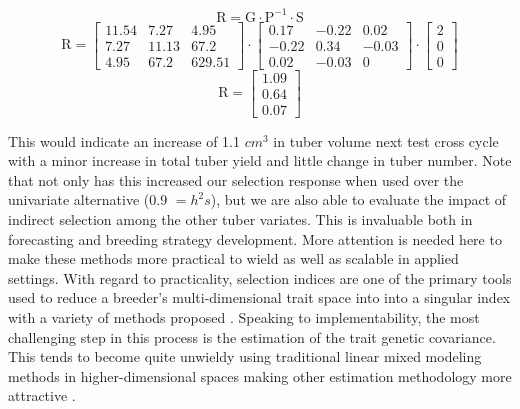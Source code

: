 \documentclass[
]{article}
\begin{document}
\[ \mathrm {R = G \cdot P^{-1} \cdot S}\]
\[ \mathrm {R} = \begin{bmatrix}11.54 & 7.27 & 4.95 \\ 7.27 & 11.13 & 67.2 \\ 4.95 & 67.2 & 629.51\end{bmatrix}\cdot\begin{bmatrix}0.17 & -0.22 & 0.02 \\ -0.22 & 0.34 & -0.03 \\ 0.02 & -0.03 & 0\end{bmatrix} \cdot \begin{bmatrix} 2 \\ 0 \\ 0 \end{bmatrix} \]
\[\mathrm {R} = \begin{bmatrix}1.09 \\ 0.64 \\ 0.07\end{bmatrix}\]

This would indicate an increase of 1.1 \(cm^3\) in tuber volume next
test cross cycle with a minor increase in total tuber yield and little
change in tuber number. Note that not only has this increased our
selection response when used over the univariate alternative (0.9
\(= h^2 s\)), but we are also able to evaluate the impact of indirect
selection among the other tuber variates. This is invaluable both in
forecasting and breeding strategy development. More attention is needed
here to make these methods more practical to wield as well as scalable
in applied settings. With regard to practicality, selection indices are
one of the primary tools used to reduce a breeder's multi-dimensional
trait space into into a singular index with a variety of methods
proposed \autocite{Kempthorne1959,Bulmer1981}. Speaking to
implementability, the most challenging step in this process is the
estimation of the trait genetic covariance. This tends to become quite
unwieldy using traditional linear mixed modeling methods in
higher-dimensional spaces making other estimation methodology more
attractive \autocite{Blows2009,Runcie2013}.
\end{document}
